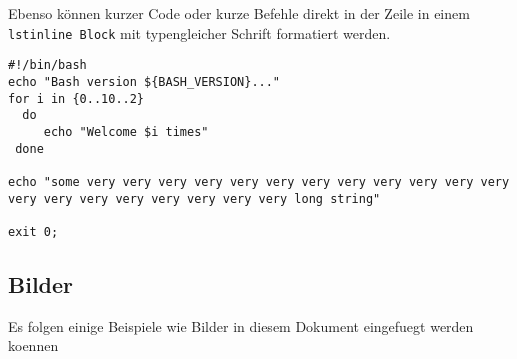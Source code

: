\documentclass[12pt,a4paper,titlepage,oneside]{scrartcl}
\begin{document}
Ebenso können kurzer Code oder kurze Befehle direkt in der Zeile in einem \lstinline{lstinline Block} mit typengleicher Schrift formatiert werden.



\begin{lstlisting}[caption=Example bash script,label=code:beispiel2,style=simple]
#!/bin/bash
echo "Bash version ${BASH_VERSION}..."
for i in {0..10..2}
  do
     echo "Welcome $i times"
 done

echo "some very very very very very very very very very very very very very very very very very very very very long string"

exit 0;
\end{lstlisting}

\subsection{Bilder}

Es folgen einige Beispiele wie Bilder in diesem Dokument eingefuegt werden koennen



%
%
\end{document}
